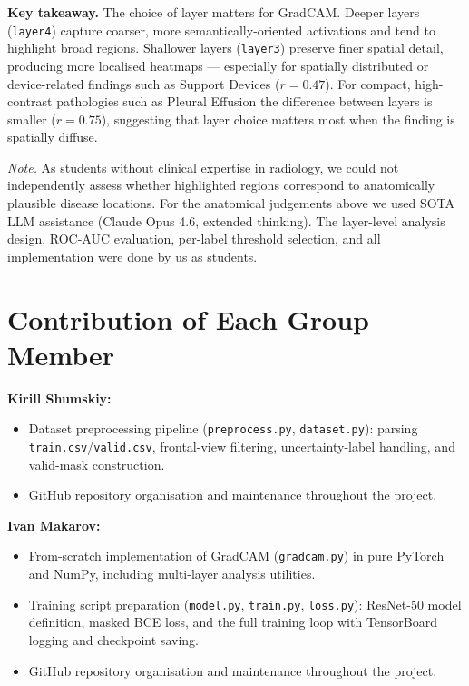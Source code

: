 \documentclass[12pt]{article}
\begin{document}
\textbf{Key takeaway.}
The choice of layer matters for GradCAM.
Deeper layers (\texttt{layer4}) capture coarser, more semantically-oriented activations and tend to highlight broad regions.
Shallower layers (\texttt{layer3}) preserve finer spatial detail, producing more localised heatmaps --- especially for spatially distributed or device-related findings such as Support Devices ($r=0.47$).
For compact, high-contrast pathologies such as Pleural Effusion the difference between layers is smaller ($r=0.75$), suggesting that layer choice matters most when the finding is spatially diffuse.

\smallskip
\textit{Note.}
As students without clinical expertise in radiology, we could not independently assess whether highlighted regions correspond to anatomically plausible disease locations.
For the anatomical judgements above we used SOTA LLM assistance (Claude Opus 4.6, extended thinking).
The layer-level analysis design, ROC-AUC evaluation, per-label threshold selection, and all implementation were done by us as students.


\section{Contribution of Each Group Member}

\textbf{Kirill Shumskiy:}
\begin{itemize}[leftmargin=*]
    \item Dataset preprocessing pipeline (\texttt{preprocess.py}, \texttt{dataset.py}): parsing \texttt{train.csv}/\texttt{valid.csv}, frontal-view filtering, uncertainty-label handling, and valid-mask construction.
    \item GitHub repository organisation and maintenance throughout the project.
\end{itemize}

\textbf{Ivan Makarov:}
\begin{itemize}[leftmargin=*]
    \item From-scratch implementation of GradCAM (\texttt{gradcam.py}) in pure PyTorch and NumPy, including multi-layer analysis utilities.
    \item Training script preparation (\texttt{model.py}, \texttt{train.py}, \texttt{loss.py}): ResNet-50 model definition, masked BCE loss, and the full training loop with TensorBoard logging and checkpoint saving.
    \item GitHub repository organisation and maintenance throughout the project.
\end{itemize}
\end{document}
